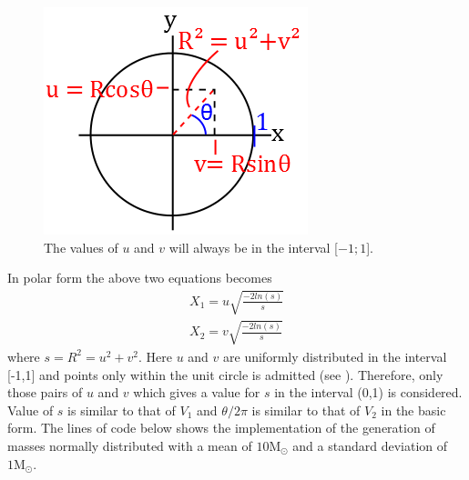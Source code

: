 \begin{figure}
\centering
	\includegraphics[width=1\linewidth]{Figures/Gaussian_mass_generation_ill.png}
\caption{
The values of $u$ and $v$ will always be in the interval [$-1;1$].
}
\label{fig:Gaussian_mass_generation_ill}
\end{figure}
In polar form the above two equations becomes
\begin{align*}
	X_1 = 
	u \sqrt{\frac{-2 ln(s)}{s}}
	\\
	X_2 = 
	v \sqrt{\frac{-2 ln(s)}{s}}
\end{align*}
where $s = R^2 = u^2 + v^2$. 
Here $u$ and $v$ are uniformly distributed in the interval [-1,1] and points only within the unit circle is admitted (see ). 
Therefore, only those pairs of $u$ and $v$ which gives a value for $s$ in the interval (0,1) is considered. 
Value of $s$ is similar to that of $V_1$ and $\theta/2\pi$ is similar to that of $V_2$ in the basic form.
The lines of code below shows the implementation of the generation of masses normally distributed with a mean of $10\text{M}_{\odot}$ and a standard deviation of $1\text{M}_{\odot}$.
\vspace{1cm}

